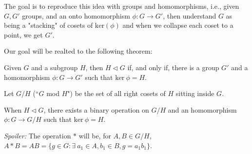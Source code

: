 The goal is to reproduce this idea with groups and homomorphisms, i.e., given $G, G'$ groups, and an onto homomorphism  $\phi: G \to G'$, then understand $G$ as being a "stacking" of cosets of $\mathrm{ker}(\phi)$ and when we collapse each coset to a point, we get $G'$.

Our goal will be realted to the following theorem:

\begin{thm}
	Given $G$ and a subgroup $H$, then $H \vartriangleleft G$ if, and only if, there is a group $G'$ and a homomorphism  $\phi: G \to G'$ such that  $\mathrm{ker}\ \phi = H$. 
\end{thm}

\begin{defn}[Notation]
	Let $G/H$ (``$G$ mod  $H$") be the set of all right cosets of $H$ sitting inside $G$.
\end{defn}

\begin{thm}
	When $H \vartriangleleft G$, there exists a binary operation on $G/H$ and an homomorphism $\phi: G \to G/H$ such that $\mathrm{ker}\ \phi = H$.
\end{thm}

\textit{Spoiler:} The operation $*$ will be, for $A, B \in G/H$, $A*B = AB = \{g \in G : \exists\ a_1 \in A, b_1 \in B, g = a_1b_1\}$.
